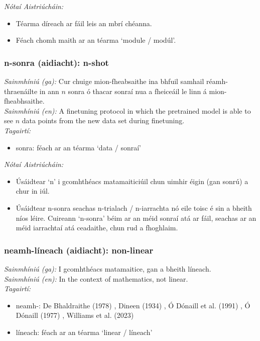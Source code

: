  \noindent \textit{Nótaí Aistriúcháin:}
\begin{itemize}
	\item Téarma díreach ar fáil leis an mbrí chéanna.
	\item Féach chomh maith ar an téarma `module / modúl'.
\end{itemize}


\subsubsection*{n-sonra (aidiacht): n-shot}
 \noindent \textit{Sainmhíniú (ga):} Cur chuige mion-fheabsaithe ina bhfuil samhail réamh-thraenáilte in ann $n$ sonra ó thacar sonraí nua a fheiceáil le linn á mion-fheabhsaithe.
\\
 \noindent \textit{Sainmhíniú (en):} A finetuning protocol in which the pretrained model is able to see $n$ data points from the new data set during finetuning.
\\
 \noindent \textit{Tagairtí:}
\begin{itemize}
	\item sonra: féach ar an téarma `data / sonraí'
\end{itemize}

 \noindent \textit{Nótaí Aistriúcháin:}
\begin{itemize}
	\item Úsáidtear `n' i gcomhthéacs matamaiticiúil chun uimhir éigin (gan sonrú) a chur in iúl.
	\item Úsáidtear n-sonra seachas n-trialach / n-iarrachta nó eile toisc é sin a bheith níos léire. Cuireann `n-sonra' béim ar an méid sonraí atá ar fáil, seachas ar an méid iarrachtaí atá ceadaithe, chun rud a fhoghlaim.
\end{itemize}


\subsubsection*{neamh-líneach (aidiacht): non-linear}
 \noindent \textit{Sainmhíniú (ga):} I gcomhthéacs matamaitice, gan a bheith líneach.
\\
 \noindent \textit{Sainmhíniú (en):} In the context of mathematics, not linear.
\\
 \noindent \textit{Tagairtí:}
\begin{itemize}
	\item neamh-: De Bhaldraithe (1978) \cite{de-bhaldraithe}, Dineen (1934) \cite{dineen}, Ó Dónaill et al. (1991) \cite{focloir-beag}, Ó Dónaill (1977) \cite{odonaill}, Williams et al. (2023) \cite{storchiste}
	\item líneach: féach ar an téarma `linear / líneach'
\end{itemize}


